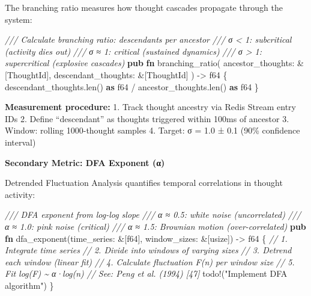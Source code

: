 \documentclass[
  11pt,
]{article}
\newenvironment{Shaded}{}{}
\newcommand{\CommentTok}[1]{\textcolor[rgb]{0.38,0.63,0.69}{\textit{#1}}}
\newcommand{\DataTypeTok}[1]{\textcolor[rgb]{0.56,0.13,0.00}{#1}}
\newcommand{\KeywordTok}[1]{\textcolor[rgb]{0.00,0.44,0.13}{\textbf{#1}}}
\newcommand{\NormalTok}[1]{#1}
\newcommand{\OperatorTok}[1]{\textcolor[rgb]{0.40,0.40,0.40}{#1}}
\newcommand{\PreprocessorTok}[1]{\textcolor[rgb]{0.74,0.48,0.00}{#1}}
\newcommand{\StringTok}[1]{\textcolor[rgb]{0.25,0.44,0.63}{#1}}
\begin{document}
The branching ratio measures how thought cascades propagate through the
system:

\begin{Shaded}
\begin{Highlighting}[]
\CommentTok{/// Calculate branching ratio: descendants per ancestor}
\CommentTok{/// σ \textless{} 1: subcritical (activity dies out)}
\CommentTok{/// σ ≈ 1: critical (sustained dynamics)}
\CommentTok{/// σ \textgreater{} 1: supercritical (explosive cascades)}
\KeywordTok{pub} \KeywordTok{fn}\NormalTok{ branching\_ratio(}
\NormalTok{    ancestor\_thoughts}\OperatorTok{:} \OperatorTok{\&}\NormalTok{[ThoughtId]}\OperatorTok{,}
\NormalTok{    descendant\_thoughts}\OperatorTok{:} \OperatorTok{\&}\NormalTok{[ThoughtId]}
\NormalTok{) }\OperatorTok{{-}\textgreater{}} \DataTypeTok{f64} \OperatorTok{\{}
\NormalTok{    descendant\_thoughts}\OperatorTok{.}\NormalTok{len() }\KeywordTok{as} \DataTypeTok{f64} \OperatorTok{/}\NormalTok{ ancestor\_thoughts}\OperatorTok{.}\NormalTok{len() }\KeywordTok{as} \DataTypeTok{f64}
\OperatorTok{\}}
\end{Highlighting}
\end{Shaded}

\textbf{Measurement procedure:} 1. Track thought ancestry via Redis
Stream entry IDs 2. Define ``descendant'' as thoughts triggered within
100ms of ancestor 3. Window: rolling 1000-thought samples 4. Target: σ =
1.0 ± 0.1 (90\% confidence interval)

\textbf{Secondary Metric: DFA Exponent (α)}

Detrended Fluctuation Analysis quantifies temporal correlations in
thought activity:

\begin{Shaded}
\begin{Highlighting}[]
\CommentTok{/// DFA exponent from log{-}log slope}
\CommentTok{/// α ≈ 0.5: white noise (uncorrelated)}
\CommentTok{/// α ≈ 1.0: pink noise (critical)}
\CommentTok{/// α ≈ 1.5: Brownian motion (over{-}correlated)}
\KeywordTok{pub} \KeywordTok{fn}\NormalTok{ dfa\_exponent(time\_series}\OperatorTok{:} \OperatorTok{\&}\NormalTok{[}\DataTypeTok{f64}\NormalTok{]}\OperatorTok{,}\NormalTok{ window\_sizes}\OperatorTok{:} \OperatorTok{\&}\NormalTok{[}\DataTypeTok{usize}\NormalTok{]) }\OperatorTok{{-}\textgreater{}} \DataTypeTok{f64} \OperatorTok{\{}
    \CommentTok{// 1. Integrate time series}
    \CommentTok{// 2. Divide into windows of varying sizes}
    \CommentTok{// 3. Detrend each window (linear fit)}
    \CommentTok{// 4. Calculate fluctuation F(n) per window size}
    \CommentTok{// 5. Fit log(F) \textasciitilde{} α·log(n)}
    \CommentTok{// See: Peng et al. (1994) [47]}
    \PreprocessorTok{todo!}\NormalTok{(}\StringTok{"Implement DFA algorithm"}\NormalTok{)}
\OperatorTok{\}}
\end{Highlighting}
\end{Shaded}
\end{document}

